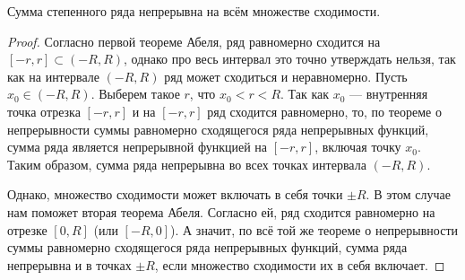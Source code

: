 \documentclass[a4paper, 12pt]{article}
\begin{document}
\begin{Consequence}
Сумма степенного ряда непрерывна на всём множестве сходимости.
\end{Consequence}

\begin{proof}
Согласно первой теореме Абеля, ряд равномерно сходится на $\left [ -r,r \right ] \subset \left ( -R, R \right )$, однако про весь интервал это точно утверждать нельзя, так как на интервале $\left ( -R, R \right )$ ряд может сходиться и неравномерно. Пусть $x_{0}\in\left ( -R, R \right )$. Выберем такое $r$, что $x_{0}<r<R$. Так как $x_{0}$ --- внутренняя точка отрезка $\left [ -r, r \right ]$ и на $\left [ -r, r \right ]$ ряд  сходится равномерно, то, по теореме о непрерывности суммы равномерно сходящегося ряда непрерывных функций, сумма ряда является непрерывной функцией на $\left [ -r,r \right ]$, включая точку $x_{0}$.
Таким образом, сумма ряда непрерывна во всех точках интервала $\left ( -R, R \right )$.
 
Однако, множество сходимости может включать в себя точки $\pm R$. В этом случае нам поможет вторая теорема Абеля. Согласно ей, ряд сходится равномерно на отрезке $[0, R]$ (или  $[-R, 0]$). А значит, по всё той же теореме о непрерывности суммы равномерно сходящегося ряда непрерывных функций, сумма ряда непрерывна и в точках $\pm R$, если множество сходимости их в себя включает.




\end{proof}
\end{document}
